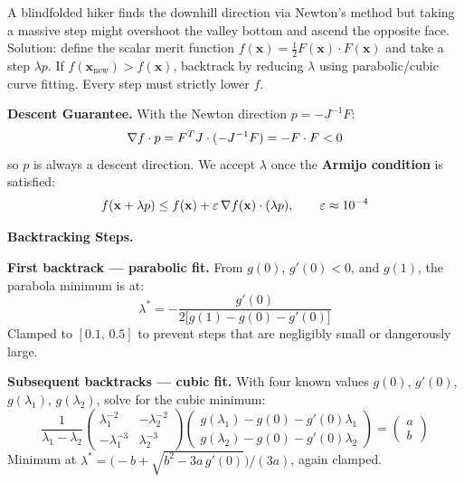 \begin{tcolorbox}[colback=yellow!5!white,colframe=yellow!60!black,
  title=The Blind Hiker Analogy]
A blindfolded hiker finds the downhill direction via Newton's method but
taking a massive step might overshoot the valley bottom and ascend the
opposite face. Solution: define the scalar merit function
$f(\mathbf{x}) = \frac{1}{2}F(\mathbf{x}) \cdot F(\mathbf{x})$ and take a
step $\lambda p$. If $f(\mathbf{x}_{\text{new}}) > f(\mathbf{x})$, backtrack
by reducing $\lambda$ using parabolic/cubic curve fitting. Every step must
strictly lower $f$.
\end{tcolorbox}

\textbf{Descent Guarantee.} With the Newton direction $p = -J^{-1}F$:
\begin{equation}
\nabla f \cdot p = F^T J \cdot (-J^{-1}F) = -F \cdot F < 0
\end{equation}
so $p$ is always a descent direction. We accept $\lambda$ once the
\textbf{Armijo condition} is satisfied:
\begin{equation}
f(\mathbf{x} + \lambda p) \leq f(\mathbf{x}) + \varepsilon\,\nabla f(\mathbf{x})\cdot(\lambda p),
\qquad \varepsilon \approx 10^{-4}
\end{equation}

\textbf{Backtracking Steps.}
\begin{tcolorbox}[colback=blue!5!white,colframe=blue!75!black,
  title=Parabolic and Cubic Polynomial Fitting]
\textbf{First backtrack — parabolic fit.} From $g(0)$, $g'(0) < 0$, and
$g(1)$, the parabola minimum is at:
\begin{equation}
\lambda^* = -\frac{g'(0)}{2\bigl[g(1) - g(0) - g'(0)\bigr]}
\end{equation}
Clamped to $[0.1,\, 0.5]$ to prevent steps that are negligibly small or
dangerously large.

\textbf{Subsequent backtracks — cubic fit.} With four known values
$g(0)$, $g'(0)$, $g(\lambda_1)$, $g(\lambda_2)$, solve for the cubic minimum:
\begin{equation}
\frac{1}{\lambda_1 - \lambda_2}
\begin{pmatrix} \lambda_1^{-2} & -\lambda_2^{-2} \\ -\lambda_1^{-3} &
\lambda_2^{-3} \end{pmatrix}
\begin{pmatrix} g(\lambda_1) - g(0) - g'(0)\lambda_1 \\
g(\lambda_2) - g(0) - g'(0)\lambda_2 \end{pmatrix}
= \begin{pmatrix} a \\ b \end{pmatrix}
\end{equation}
Minimum at $\lambda^* = \bigl(-b + \sqrt{b^2 - 3a\,g'(0)}\bigr)/(3a)$,
again clamped.
\end{tcolorbox}

